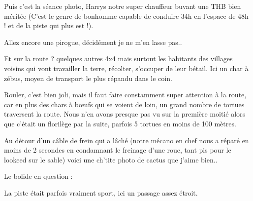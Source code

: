 \begin{multicols}{2}

Puis c'est la séance photo, Harrys notre super chauffeur buvant une THB bien méritée (C'est le genre de bonhomme capable de conduire 34h en l'espace de 48h ! et de la piste qui plus est !).


Allez encore une pirogue, décidément je ne m'en lasse pas..


Et sur la route ? quelques autres 4x4 mais surtout les habitants des villages voisins qui vont travailler la terre, récolter, s'occuper de leur bétail. Ici un char à zébus, moyen de transport le plus répandu dans le coin.


Rouler, c'est bien joli, mais il faut faire constamment super attention à la route, car en plus des chars à bœufs qui se voient de loin, un grand nombre de tortues traversent la route. Nous n'en avons presque pas vu sur la première moitié alors que c'était un florilège par la suite, parfois 5 tortues en moins de 100 mètres.


Au détour d'un câble de frein qui a lâché (notre mécano en chef nous a réparé en moins de 2 secondes en condamnant le freinage d'une roue, tant pis pour le lookeed sur le sable) voici une ch'tite photo de cactus que j'aime bien..


Le bolide en question :


La piste était parfois vraiment sport, ici un passage assez étroit.


\end{multicols}
